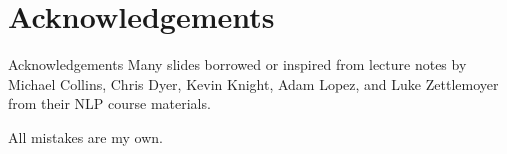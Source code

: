 
\section*{Acknowledgements}

\begin{frame}
\centering
\begin{alertblock}{Acknowledgements}
Many slides borrowed or inspired from lecture notes by Michael Collins, Chris Dyer, Kevin Knight, Adam Lopez, and Luke Zettlemoyer from their NLP course materials. 

\bigskip

All mistakes are my own.
\end{alertblock}
\end{frame}

